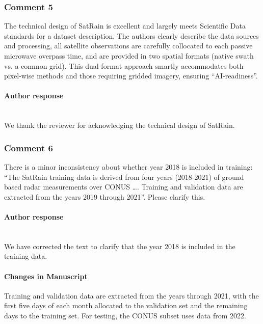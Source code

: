 \begin{itemize}
\begin{itemize}
\begin{change}[180]
  \end{change}
\end{itemize}


\subsubsection*{Comment 5}
\rc


The technical design of SatRain is excellent and largely meets
Scientific Data standards for a dataset description. The authors clearly
describe the data sources and processing, all satellite observations are
carefully collocated to each passive microwave overpass time, and are provided
in two spatial formats (native swath vs. a common grid). This dual-format
approach smartly accommodates both pixel-wise methods and those requiring
gridded imagery, ensuring “AI-readiness”.

\reply

\paragraph*{Author response} \\

We thank the reviewer for acknowledging the technical design of SatRain.

\subsubsection*{Comment 6}

\rc

There is a minor inconsistency about whether year 2018 is included in training:
“The SatRain training data is derived from four years (2018-2021) of ground
based radar measurements over CONUS …. Training and validation data are
extracted from the years 2019 through 2021”. Please clarify this.

\reply
\paragraph*{Author response} \\

We have corrected the text to clarify that the year 2018 is included in the training data.

\paragraph*{Changes in Manuscript}

\begin{change}[386]
Training and validation data are extracted from the years \DIFdelbegin {}\DIFdelend \DIFaddbegin {}\DIFaddend through 2021, with the first five days of each month allocated to the validation
set and the remaining days to the training set. For testing, the CONUS subset
uses data from 2022.
\end{change}


\end{itemize}
